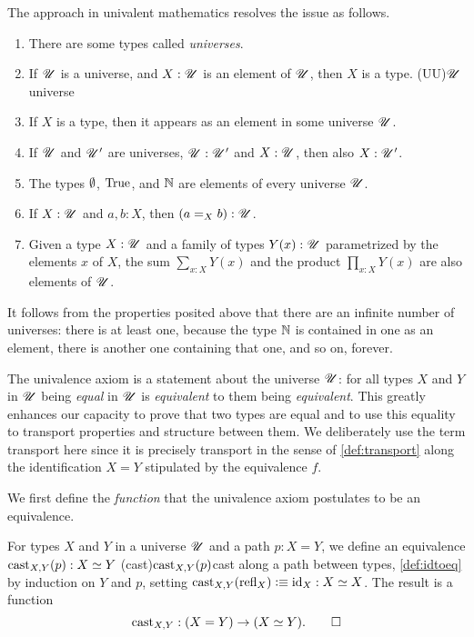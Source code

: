 The approach in univalent mathematics resolves the issue as follows.

\begin{enumerate}
\item There are some types called \emph{universes}.
\item If ${\mathscr{U}}$ is a universe, and $X : {\mathscr{U}}$ is an element of ${\mathscr{U}}$, then $X$ is a type.%
  \glossary(UU){$\protect{\mathscr{U}}$}{universe}
\item If $X$ is a type, then it appears as an element in some universe ${\mathscr{U}}$.
\item If ${\mathscr{U}}$ and ${\mathscr{U}}'$ are universes, ${\mathscr{U}}:{\mathscr{U}}'$ and $X:{\mathscr{U}}$, then also $X:{\mathscr{U}}'$.
\item The types $\emptyset$, $\mathrm{True}$, and $\mathbb{N}$ are elements of every universe ${\mathscr{U}}$.
\item If $X : {\mathscr{U}}$ and $a,b:X$, then $(a = _X b) : {\mathscr{U}}$.
\item Given a type $X:{\mathscr{U}}$ and a family of types $Y(x):{\mathscr{U}}$ parametrized by the elements $x$ of $X$, the sum $\sum_{x:X} Y(x)$ and the product
  $\prod_{x:X} Y(x)$ are also elements of ${\mathscr{U}}$.
\end{enumerate}

It follows from the properties posited above that there are an infinite number of universes: there is at least one, because the type $\mathbb{N}$ is
contained in one as an element, there is another one containing that one, and so on, forever.

The univalence axiom is a statement about the universe ${\mathscr{U}}$:
for all types $X$ and $Y$ in ${\mathscr{U}}$ being \emph{equal} in ${\mathscr{U}}$ is
\emph{equivalent} to them being \emph{equivalent}. This greatly
enhances our capacity to prove that two types are equal
and to use this equality to transport properties and structure
between them. We deliberately use the term transport
here since it is precisely transport in the sense of
\cref{def:transport} along the identification
$X = Y$ stipulated by the equivalence $f$.

We first define the \emph{function} that
the univalence axiom postulates to be an equivalence.

\begin{definition}\label{def:idtoeq}
  For types $X$ and $Y$ in a universe ${\mathscr{U}}$ and a path $p : X = Y$,
  we define an equivalence $\cast_{X,Y} (p) : X\equiv Y$
  \glossary(cast){$\protect\cast_{X,Y} (p)$}{cast along a path between types, \cref{def:idtoeq}}
  by induction on $Y$ and $p$,
  setting $\cast_{X,Y} (\refl X) \defeq \id_X : X \equiv X$.
  The result is a function
  \[
    \cast_{X,Y} : (X = Y) \to (X\equiv Y).\qedhere
  \]
\end{definition}

